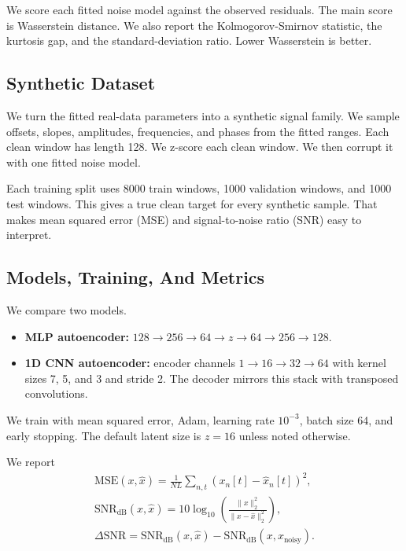 \documentclass{article}
\begin{document}
We score each fitted noise model against the observed residuals. The main score is Wasserstein distance. We also report the Kolmogorov-Smirnov statistic, the kurtosis gap, and the standard-deviation ratio. Lower Wasserstein is better.

\subsection{Synthetic Dataset}

We turn the fitted real-data parameters into a synthetic signal family. We sample offsets, slopes, amplitudes, frequencies, and phases from the fitted ranges. Each clean window has length 128. We z-score each clean window. We then corrupt it with one fitted noise model.

Each training split uses 8000 train windows, 1000 validation windows, and 1000 test windows. This gives a true clean target for every synthetic sample. That makes mean squared error (MSE) and signal-to-noise ratio (SNR) easy to interpret.

\subsection{Models, Training, And Metrics}

We compare two models.
\begin{itemize}
  \item \textbf{MLP autoencoder:} $128 \rightarrow 256 \rightarrow 64 \rightarrow z \rightarrow 64 \rightarrow 256 \rightarrow 128$.
  \item \textbf{1D CNN autoencoder:} encoder channels $1 \rightarrow 16 \rightarrow 32 \rightarrow 64$ with kernel sizes 7, 5, and 3 and stride 2. The decoder mirrors this stack with transposed convolutions.
\end{itemize}

We train with mean squared error, Adam, learning rate $10^{-3}$, batch size 64, and early stopping. The default latent size is $z=16$ unless noted otherwise.

We report
\begin{gather}
\mathrm{MSE}(x, \hat{x}) = \frac{1}{NL}\sum_{n,t}(x_n[t]-\hat{x}_n[t])^2, \\
\mathrm{SNR}_{\mathrm{dB}}(x, \hat{x}) = 10\log_{10}\left(\frac{\|x\|_2^2}{\|x-\hat{x}\|_2^2}\right), \\
\Delta\mathrm{SNR} = \mathrm{SNR}_{\mathrm{dB}}(x, \hat{x}) - \mathrm{SNR}_{\mathrm{dB}}(x, x_{\mathrm{noisy}}).
\end{gather}
\end{document}
